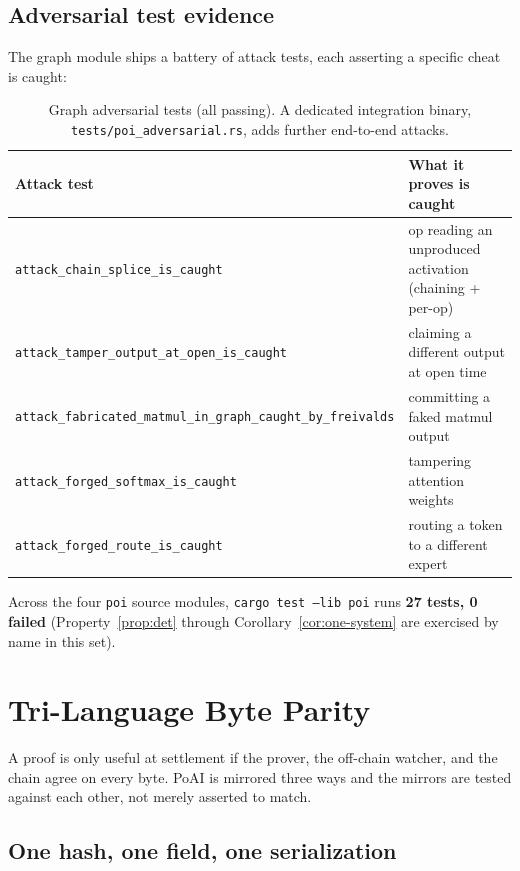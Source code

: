 \documentclass[11pt,a4paper]{article}
\begin{document}
\subsection{Adversarial test evidence}\label{sec:adversarial}

The graph module ships a battery of attack tests, each asserting a specific cheat is caught:

\begin{table}[h]
\centering
\begin{tabular}{ll}
\toprule
\textbf{Attack test} & \textbf{What it proves is caught} \\
\midrule
\texttt{attack\_chain\_splice\_is\_caught} & op reading an unproduced activation (chaining + per-op) \\
\texttt{attack\_tamper\_output\_at\_open\_is\_caught} & claiming a different output at open time \\
\texttt{attack\_fabricated\_matmul\_in\_graph\_caught\_by\_freivalds} & committing a faked matmul output \\
\texttt{attack\_forged\_softmax\_is\_caught} & tampering attention weights \\
\texttt{attack\_forged\_route\_is\_caught} & routing a token to a different expert \\
\bottomrule
\end{tabular}
\caption{Graph adversarial tests (all passing). A dedicated integration binary, \texttt{tests/poi\_adversarial.rs}, adds further end-to-end attacks.}
\end{table}

Across the four \texttt{poi} source modules, \texttt{cargo test --lib poi} runs \textbf{27 tests, 0 failed} (Property~\ref{prop:det} through Corollary~\ref{cor:one-system} are exercised by name in this set).

\section{Tri-Language Byte Parity}\label{sec:parity}

A proof is only useful at settlement if the prover, the off-chain watcher, and the chain agree on every byte. PoAI is mirrored three ways and the mirrors are tested against each other, not merely asserted to match.

\subsection{One hash, one field, one serialization}
\end{document}
